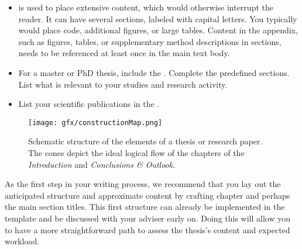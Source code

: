 \begin{itemize}
    \item {} is used to place extensive content, which would otherwise interrupt the reader. It can have several sections, labeled with capital letters. You typically would place code, additional figures, or large tables. Content in the appendix, such as figures, tables, or supplementary method descriptions in sections, needs to be referenced at least once in the main text body.
    
    \item For a master or PhD thesis, include the . Complete the predefined sections. List what is relevant to your studies and research activity.
    
    \item List your scientific publications in the .
    
\end{itemize}

\begin{figure}
    \centering
    \texttt{[image: gfx/constructionMap.png]}
    \caption{Schematic structure of the elements of a thesis or research paper. The cones depict the ideal logical flow of the chapters of the \textit{Introduction} and \textit{Conclusions \& Outlook}. }
    \label{fig:logicalFlow}
\end{figure}

As the first step in your writing process, we recommend that you lay out the anticipated structure and approximate content by crafting chapter and perhaps the main section titles. This first structure can already be implemented in the template and be discussed with your adviser early on. Doing this will allow you to have a more straightforward path to assess the thesis's content and expected workload.


